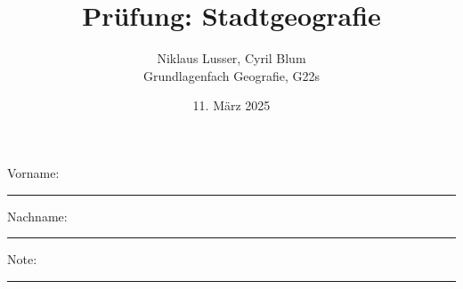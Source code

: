 \newtoggle{withbonus} \togglefalse{withbonus} %

\newcommand{\mycourse}{Grundlagenfach Geografie}
\newcommand{\myclass}{G22s}
\newcommand{\mydate}{11. März 2025}

\title{\textbf{Prüfung: Stadtgeografie}}
\author{Niklaus Lusser, Cyril Blum\\
	\mycourse, \myclass}
\date{\mydate}
\maketitle
\thispagestyle{headandfoot}

\begin{center}
\end{center}
\vspace{10mm}

\begin{center}
	Vorname: \rule{45mm}{0.8pt}\qquad Nachname: \rule{45mm}{0.8pt}
\end{center}
\vspace{20mm}

\begin{center}
	\iftoggle{withbonus} {
		\combinedgradetable[h][questions]
	} {
		\gradetable[h][questions]
	}
\end{center}
\vspace{15mm}
\begin{center}
	Note:
	\vspace{10mm}

	\rule{8mm}{1.2pt}
\end{center}
\clearpage

